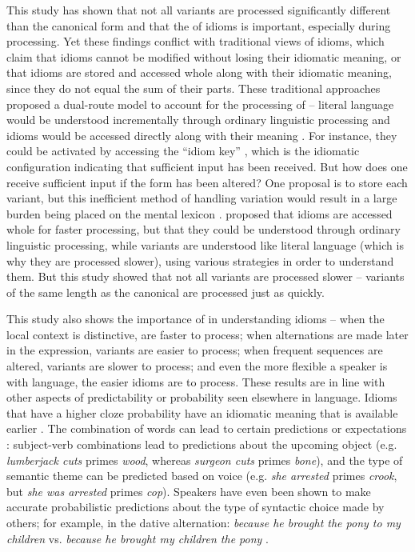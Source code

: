 \documentclass[output=paper
,modfonts
,nonflat]{langsci/langscibook}
\begin{document}
This study has shown that not all variants are processed significantly different than the canonical form and that the  of idioms is important, especially during processing. Yet these findings conflict with traditional views of idioms, which claim that idioms cannot be modified without losing their idiomatic meaning, or that idioms are stored and accessed whole along with their idiomatic meaning, since they do not equal the sum of their parts. These traditional approaches proposed a dual-route model to account for the processing  of  -- literal language  would be understood incrementally through ordinary linguistic processing and idioms would be accessed directly along with their meaning \citep[cf.][]{SwinneyCutler1979, CacciariTabossi1988}. For instance, they could be activated by accessing the ``idiom key'' \citep{CacciariTabossi1988}, which is the idiomatic configuration indicating that sufficient input has been received. But how does one receive sufficient input if the form has been altered? One proposal is to store each variant, but this inefficient method of handling variation  would result in a large burden being placed on the mental lexicon \citep{BaayenEtAl2013}. \citet{McGloneEtAl1994} proposed that idioms are accessed whole for faster processing, but that they could be understood through ordinary linguistic processing, while variants are understood like literal language  (which is why they are processed slower), using various strategies in order to understand them. But this study showed that not all variants are processed slower -- variants of the same length as the canonical are processed  just as quickly.

This study also shows the importance of  in understanding idioms -- when the local context is distinctive,  are faster to process; when alternations are made later in the expression, variants are easier to process; when frequent sequences are altered, variants are slower to process; and even the more flexible a speaker is with language, the easier idioms are to process. These results are in line with other aspects of predictability or probability seen elsewhere in language. Idioms that have a higher cloze probability have an idiomatic meaning that is available earlier \citep{CacciariTabossi1988, TitoneConnine1994b}. The combination of words can lead to certain predictions or expectations \citep{Elman2011}: subject-verb combinations lead to predictions about the upcoming object (e.g. \textit{lumberjack cuts} primes \textit{wood}, whereas \textit{surgeon cuts} primes \textit{bone}), and the type of semantic theme can be predicted based on voice (e.g. \textit{she arrested} primes \textit{crook}, but \textit{she was arrested} primes \textit{cop}). Speakers have even been shown to make accurate probabilistic predictions about the type of syntactic choice made by others; for example, in the dative alternation: \textit{because he brought the pony to my children} vs. \textit{because he brought my children the pony} \citep{Bresnan2007}.
\end{document}
